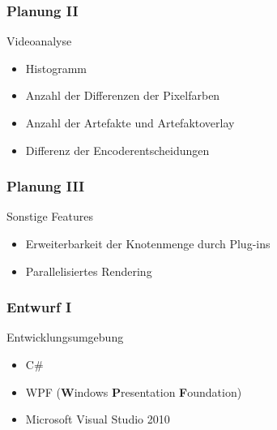 \documentclass[t]{beamer}
\begin{document}
\begin{frame}
	\frametitle{Planung II}
	
	Videoanalyse ~\\
	\begin{itemize}
		\item<+-> Histogramm
		\item<+-> Anzahl der Differenzen der Pixelfarben
		\item<+-> Anzahl der Artefakte und Artefaktoverlay
		\item<+-> Differenz der Encoderentscheidungen
	\end{itemize}
\end{frame}

\begin{frame}
	\frametitle{Planung III}
	
	Sonstige Features ~\\
	\begin{itemize}
		\item<+-> Erweiterbarkeit der Knotenmenge durch Plug-ins
		\item<+-> Parallelisiertes Rendering
	\end{itemize}
\end{frame}

\begin{frame}
	\frametitle{Entwurf I}
	
	Entwicklungsumgebung ~\\
	\begin{itemize}
		\item<+-> C\#
		\item<+-> WPF (\textbf{W}indows \textbf{P}resentation \textbf{F}oundation)
		\item<+-> Microsoft Visual Studio 2010
	\end{itemize}
\end{frame}
\end{document}
